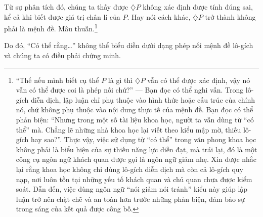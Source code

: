 Từ sự phân tích đó, chúng ta thấy được $\diamondsuit P$ không xác định được tính đúng sai, kể cả khi biết được giá trị chân lí của $P$. Hay nói cách khác, $\diamondsuit P$ trở thành không phải là mệnh đề. Mâu thuẫn.\footnote{``Thế nếu mình biết cụ thể $P$ là gì thì $\diamondsuit P$ vẫn có thể được xác định, vậy nó vẫn có thể được coi là phép nối chứ?'' --- Bạn đọc có thể nghi vấn. Trong lô-gích diễn dịch, lập luận chỉ phụ thuộc vào hình thức hoặc cấu trúc của chính nó, chứ không phụ thuộc vào nội dung thực tế của mệnh đề. Bạn đọc có thể phản biện: ``Nhưng trong một số tài liệu khoa học, người ta vẫn dùng từ ``có thể'' mà. Chẳng lẽ những nhà khoa học lại viết theo kiểu mập mờ, thiếu lô-gích hay sao?''. Thực vậy, việc sử dụng từ ``có thể'' trong văn phong khoa học không phải là biểu hiện của sự thiếu năng lực diễn đạt, mà trái lại, đó là một công cụ ngôn ngữ khách quan được gọi là ngôn ngữ giảm nhẹ. Xin được nhắc lại rằng khoa học không chỉ dùng lô-gích diễn dịch mà còn cả lô-gích quy nạp, nơi luôn tồn tại những yếu tố khách quan và chủ quan chưa được kiểm soát. Dẫn đến, việc dùng ngôn ngữ ``nói giảm nói tránh'' kiểu này giúp lập luận trở nên chặt chẽ và an toàn hơn trước những phản biện, đảm bảo sự trong sáng của kết quả được công bố.}

Do đó, ``Có thể rằng\dots'' không thể biểu diễn dưới dạng phép nối mệnh đề lô-gích và chúng ta có điều phải chứng minh.